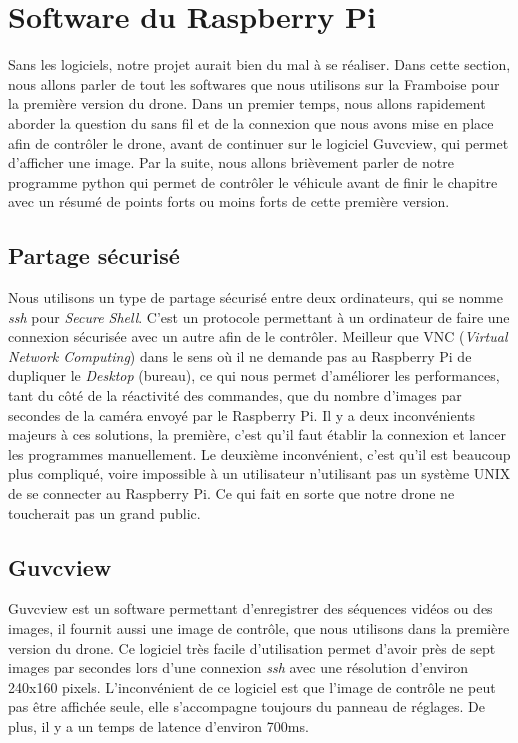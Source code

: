 \documentclass[a4paper,11pt]{report}
\begin{document}
{\section{Software du Raspberry Pi}

Sans les logiciels, notre projet aurait bien du mal à se réaliser. Dans cette section, nous allons parler de tout les softwares que nous utilisons sur la Framboise pour la première version du drone. Dans un premier temps, nous allons rapidement aborder la question du sans fil et de la connexion que nous avons mise en place afin de contrôler le drone, avant de continuer sur le logiciel Guvcview, qui permet d'afficher une image. Par la suite, nous allons brièvement parler de notre programme python qui permet de contrôler le véhicule avant de finir le chapitre avec un résumé de points forts ou moins forts de cette première version.





\subsection{Partage sécurisé}

Nous utilisons un type de partage sécurisé entre deux ordinateurs, qui se nomme \textit{ssh} pour \textit{Secure Shell}. C'est un protocole permettant à un ordinateur de faire une connexion sécurisée avec un autre afin de le contrôler. Meilleur que VNC (\textit{Virtual Network Computing}) dans le sens où il ne demande pas au Raspberry Pi de dupliquer le \textit{Desktop} (bureau), ce qui nous permet d'améliorer les performances, tant du côté de la réactivité des commandes, que du nombre d'images par secondes de la caméra envoyé par le Raspberry Pi. Il y a deux inconvénients majeurs à ces solutions, la première, c'est qu'il faut établir la connexion et lancer les programmes manuellement. Le deuxième inconvénient, c'est qu'il est beaucoup plus compliqué, voire impossible à un utilisateur n'utilisant pas un système UNIX de se connecter au Raspberry Pi. Ce qui fait en sorte que notre drone ne toucherait pas un grand public.

\subsection{Guvcview}

Guvcview\label{Guvcview} est un software permettant d'enregistrer des séquences vidéos ou des images, il fournit aussi une image de contrôle, que nous utilisons dans la première version du drone. Ce logiciel très facile d'utilisation permet d'avoir près de sept images par secondes lors d'une connexion \textit{ssh} avec une résolution d'environ 240x160 pixels. L'inconvénient de ce logiciel est que l'image de contrôle ne peut pas être affichée seule, elle s'accompagne toujours du panneau de réglages. De plus, il y a un temps de latence d'environ 700ms. 

}
\end{document}
